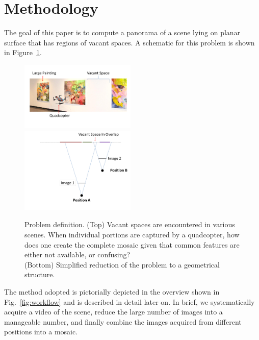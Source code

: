 \documentclass[10pt,twocolumn,letterpaper]{article}
\begin{document}

\section{Methodology}

The goal of this paper is to compute a panorama of a scene lying on
planar surface that has regions of vacant spaces.  A schematic for
this problem is shown in Figure~\ref{fig:schematic}.

\begin{figure}[h!]
  \centering
  \includegraphics[width=0.49\textwidth]{figures/indoor}\\
  \includegraphics[width=0.49\textwidth]{figures/stereoOverlap}\\

  \caption{ \label{fig:schematic} Problem definition. (Top) Vacant spaces
    are encountered in various scenes.  When individual portions are
    captured by a quadcopter, how does one create the complete mosaic
    given that common features are either not available, or
    confusing?\\
    (Bottom) Simplified reduction of the problem to a geometrical structure.
  }
\end{figure}    

The method adopted is pictorially depicted in the overview shown in
Fig.~\ref{fig:workflow} and is described in detail later on.  In
brief, we systematically acquire a video of the scene, reduce the large
number of images into a manageable number, and finally combine the
images acquired from different positions into a mosaic.
\end{document}
